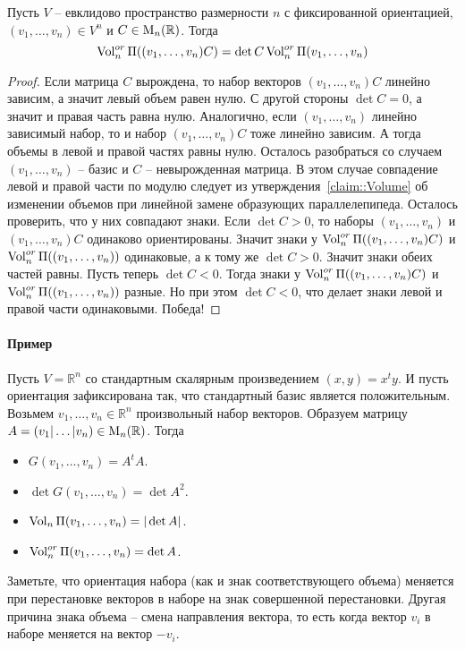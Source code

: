 \begin{claim}
Пусть $V$ -- евклидово пространство размерности $n$ с фиксированной ориентацией, $(v_1,\ldots,v_n)\in V^n$ и $C\in \operatorname{M}_{n}(\mathbb R)$.
Тогда
\[
\operatorname{Vol}^{or}_n\Pi((v_1,\ldots,v_n)C) = \det C \operatorname{Vol}^{or}_n\Pi(v_1,\ldots,v_n)
\]
\end{claim}
\begin{proof}
Если матрица $C$ вырождена, то набор векторов $(v_1,\ldots,v_n)C$ линейно зависим, а значит левый объем равен  нулю.
С другой стороны $\det C = 0$, а значит и правая часть равна нулю.
Аналогично, если $(v_1,\ldots,v_n)$ линейно зависимый набор, то и набор $(v_1,\ldots,v_n)C$ тоже линейно зависим.
А тогда объемы в левой и правой частях равны нулю.
Осталось разобраться со случаем $(v_1,\ldots, v_n)$ -- базис и $C$ -- невырожденная матрица.
В этом случае совпадение левой и правой части по модулю следует из утверждения~\ref{claim::Volume} об изменении объемов при линейной замене образующих параллелепипеда.
Осталось проверить, что у них совпадают знаки.
Если $\det C > 0$, то наборы $(v_1,\ldots,v_n)$ и $(v_1,\ldots, v_n)C$ одинаково ориентированы.
Значит знаки у $\operatorname{Vol}^{or}_n\Pi((v_1,\ldots, v_n)C) $ и $\operatorname{Vol}^{or}_n \Pi((v_1,\ldots, v_n))$ одинаковые, а к тому же $\det C > 0$.
Значит знаки обеих частей равны.
Пусть теперь $\det C < 0$.
Тогда знаки у $\operatorname{Vol}^{or}_n\Pi((v_1,\ldots, v_n)C) $ и $\operatorname{Vol}^{or}_n \Pi((v_1,\ldots, v_n))$ разные.
Но при этом $\det C < 0$, что делает знаки левой и правой части одинаковыми.
Победа!
\end{proof}

\paragraph{Пример}

Пусть $V = \mathbb R^n$ со стандартным скалярным произведением $(x, y) = x^t y$.
И пусть ориентация зафиксирована так, что стандартный базис является положительным.
Возьмем $v_1,\ldots,v_n\in \mathbb R^n$ произвольный набор векторов.
Образуем матрицу $A = (v_1|\ldots|v_n)\in \operatorname{M}_{n}(\mathbb R)$.
Тогда 
\begin{itemize}
\item $G(v_1,\ldots,v_n) = A^t A$.

\item $\det G(v_1,\ldots,v_n) = \det A^2$.

\item $\operatorname{Vol}_n\Pi(v_1,\ldots,v_n) = |\det A|$.

\item $\operatorname{Vol}^{or}_n\Pi(v_1,\ldots,v_n) = \det A$.
\end{itemize}
Заметьте, что ориентация набора (как и знак соответствующего объема) меняется при перестановке векторов в наборе на знак совершенной перестановки.
Другая причина знака объема -- смена направления вектора, то есть когда вектор $v_i$ в наборе меняется на вектор $-v_i$.

